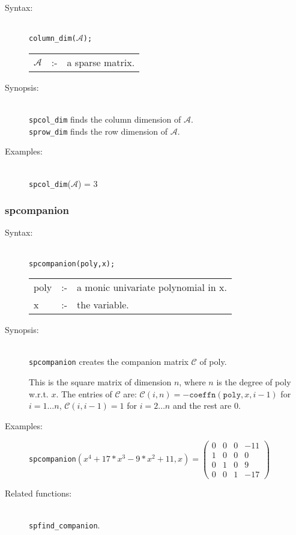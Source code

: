 \begin{description}
\item[Syntax:]\mbox{}\\
\texttt{column\_dim($\mathcal{A}$);}\\[2mm]
\begin{tabular}{l l l}
$\mathcal{A}$ &:-& a sparse matrix.
\end{tabular}

\item[Synopsis:]\mbox{}\\
\texttt{spcol\_dim} finds the column dimension of
                $\mathcal{A}$. \\
\texttt{sprow\_dim} finds the row dimension of $\mathcal{A}$.

\item[Examples:]\mbox{}\\
\texttt{spcol\_dim}($\mathcal{A}$) = 3
\end{description}

\subsubsection{spcompanion}
\label{sparse:spcompanion}

\begin{description}
\item[Syntax:]\mbox{}\\
\texttt{spcompanion(poly,x);}\\[2mm]
\begin{tabular}{l l l}
poly &:-& a monic univariate polynomial in x. \\
x    &:-& the variable.
\end{tabular}

\item[Synopsis:]\mbox{}\\
                \texttt{spcompanion} creates the companion matrix $\mathcal{C}$
                of poly.

This is the square matrix of dimension $n$, where $n$ is the degree of poly
w.r.t. $x$.
The entries of $\mathcal{C}$ are:
                $\mathcal{C}(i,n) = -\texttt{coeffn}(\texttt{poly},x,i-1)$ for $i = 1
                \ldots n$, $\mathcal{C}(i,i-1) = 1$ for $i = 2 \ldots n$ and
                the rest are $0$.

\item[Examples:]
\begin{flushleft}
\texttt{spcompanion}\((x^4+17*x^3-9*x^2+11,x) =
\begin{pmatrix}
  0 & 0 & 0 & -11 \\ 1 & 0 & 0 & 0 \\ 0 & 1 & 0 & 9 \\ 0 & 0 & 1 & -17
\end{pmatrix}
\)
\end{flushleft}

\item[Related functions:]\mbox{}\\
\texttt{spfind\_companion}.
\end{description}

